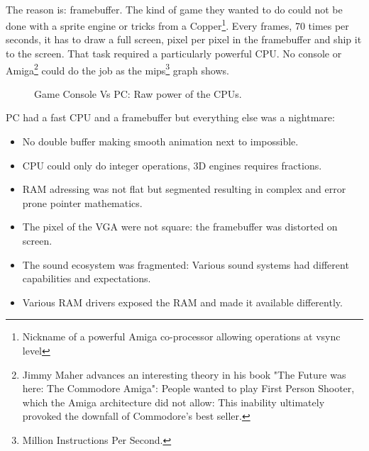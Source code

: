 \\
The reason is: framebuffer. The kind of game they wanted to do could not be done with a sprite engine or tricks from a Copper\footnote{Nickname of a powerful Amiga co-processor allowing operations at vsync level}. Every frames, 70 times per seconds, it has to draw a full screen, pixel per pixel in the framebuffer and ship it to the screen. That task required a particularly powerful CPU. No console or Amiga\footnote{Jimmy Maher advances an interesting theory in his book "The Future was here: The Commodore Amiga": People wanted to play First Person Shooter, which the Amiga architecture did not allow: This inability ultimately provoked the downfall of Commodore's best seller.} could do the job as the mips\footnote{Million Instructions Per Second.} graph shows.
\par
\begin{figure}[H]
\centering
   \caption{Game Console Vs PC: Raw power of the CPUs.} \label{fig:game_console_vs_PC}
 \end{figure}
 
PC had a fast CPU and a framebuffer but everything else was a nightmare:
\begin{itemize}
\item No double buffer making smooth animation next to impossible.
\item CPU could only do integer operations, 3D engines requires fractions.
\item RAM adressing was not flat but segmented resulting in complex and error prone pointer mathematics.
\item The pixel of the VGA were not square: the framebuffer was distorted on screen.
\item The sound ecosystem was fragmented: Various sound systems had different capabilities and expectations.
\item Various RAM drivers exposed the RAM and made it available differently.
\end{itemize}

